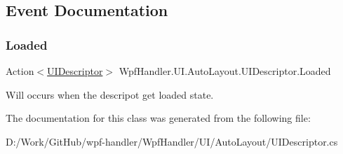 \subsection{Event Documentation}
\mbox{\label{class_wpf_handler_1_1_u_i_1_1_auto_layout_1_1_u_i_descriptor_abaa60ede8bf9e59734238f1beadaf50e}} 
\subsubsection{\texorpdfstring{Loaded}{Loaded}}
{\footnotesize\ttfamily Action$<$\mbox{\hyperlink{class_wpf_handler_1_1_u_i_1_1_auto_layout_1_1_u_i_descriptor}{U\+I\+Descriptor}}$>$ Wpf\+Handler.\+U\+I.\+Auto\+Layout.\+U\+I\+Descriptor.\+Loaded}



Will occurs when the descripot get loaded state. 



The documentation for this class was generated from the following file\+:\begin{DoxyCompactItemize}
\item 
D\+:/\+Work/\+Git\+Hub/wpf-\/handler/\+Wpf\+Handler/\+U\+I/\+Auto\+Layout/U\+I\+Descriptor.\+cs\end{DoxyCompactItemize}
